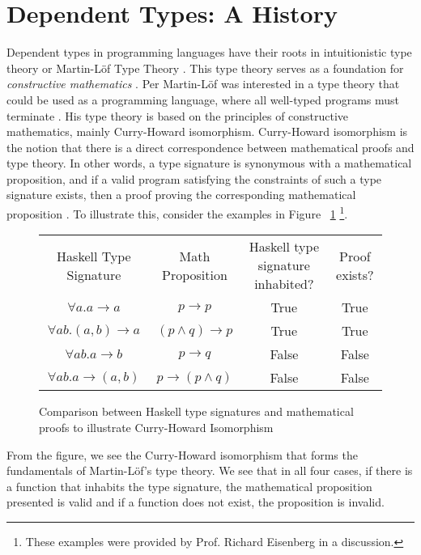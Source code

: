 \section{Dependent Types: A History}
Dependent types in programming languages have their roots in intuitionistic type
theory or Martin-L\"{o}f Type Theory \cite{intro_martin_lof,ml_type_theory}.
This type theory serves as a foundation for \textit{constructive mathematics}
\cite{martin_lof}. Per Martin-L\"{o}f was interested in a type theory that could
be used as a programming language, where all well-typed programs must terminate
\cite{ml_type_theory}. His type theory is based on the principles of
constructive mathematics, mainly Curry-Howard isomorphism. Curry-Howard
isomorphism is the notion that there is a direct correspondence between
mathematical proofs and type theory. In other words, a type signature is
synonymous with a mathematical proposition, and if a valid program satisfying
the constraints of such a type signature exists, then a proof proving the
corresponding mathematical proposition \cite{martin_lof,ml_type_theory}. To
illustrate this, consider the examples in Figure ~\ref{ml_type_theory_examples}
\footnote{These examples were provided by Prof. Richard Eisenberg in a
discussion.}. 

\begin{figure}[h]
    \label{ml_type_theory_examples}
    \caption{Comparison between Haskell type signatures and mathematical proofs to illustrate Curry-Howard Isomorphism}
    \begin{tabular}{c|c|c|c}
        Haskell Type Signature & Math Proposition & Haskell type signature inhabited? & Proof exists? \\
        $\forall a. a \rightarrow a$ & $p \rightarrow p$ & True & True \\
        $\forall ab. (a,b) \rightarrow a$ & $ (p \wedge q) \rightarrow p$ & True & True \\
        $\forall ab. a \rightarrow b$ & $p\rightarrow q$ & False & False \\
        $\forall ab. a \rightarrow (a,b)$ & $p \rightarrow (p\wedge q)$ & False & False 
    \end{tabular}
\end{figure}

From the figure, we see the Curry-Howard isomorphism that forms the fundamentals
of Martin-L\"{o}f's type theory. We see that in all four cases, if there is a
function that inhabits the type signature, the mathematical proposition
presented is valid and if a function does not exist, the proposition is invalid. 

